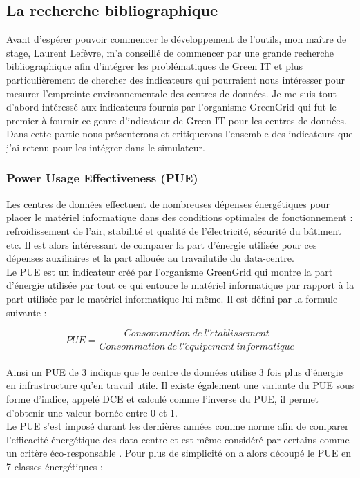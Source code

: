 \subsection{La recherche bibliographique}
Avant d'espérer pouvoir commencer le développement de l'outils, mon maître de stage, Laurent Lefèvre, m'a conseillé de commencer par une grande recherche bibliographique afin d'intégrer les problématiques de Green IT et plus particulièrement de chercher des indicateurs qui pourraient nous intéresser pour mesurer l'empreinte environnementale des centres de données. Je me suis tout d'abord intéressé aux indicateurs fournis par l'organisme GreenGrid qui fut le premier à fournir ce genre d'indicateur de Green IT pour les centres de données.\\

Dans cette partie nous présenterons et critiquerons l'ensemble des indicateurs que j'ai retenu pour les intégrer dans le simulateur.

\subsubsection{Power Usage Effectiveness (PUE)}
Les centres de données effectuent de nombreuses dépenses énergétiques pour placer le matériel informatique dans des conditions optimales de fonctionnement : refroidissement de l'air, stabilité et qualité de l'électricité, sécurité du bâtiment etc. Il est alors intéressant de comparer la part d'énergie utilisée pour ces dépenses auxiliaires et la part allouée au \gls{travailutile} du data-centre.\\

Le PUE est un indicateur créé par l'organisme GreenGrid qui montre la part d'énergie utilisée par tout ce qui entoure le matériel informatique par rapport à la part utilisée par le matériel informatique lui-même. Il est défini par la formule suivante :

\[PUE=\frac{Consommation\ de\ l'\acute{e}tablissement}{Consommation\ de\ l'\acute{e}quipement\ informatique}\]\\
Ainsi un PUE de 3 indique que le centre de données utilise 3 fois plus d'énergie en infrastructure qu'en travail utile. Il existe également une variante du PUE sous forme d'indice, appelé DCE et calculé comme l'inverse du PUE, il permet d'obtenir une valeur bornée entre 0 et 1.\\

Le PUE s'est imposé durant les dernières années comme norme afin de comparer l'efficacité énergétique des data-centre et est même considéré par certains comme un critère \og éco-responsable \fg{}. Pour plus de simplicité on a alors découpé le PUE en 7 classes énergétiques :

